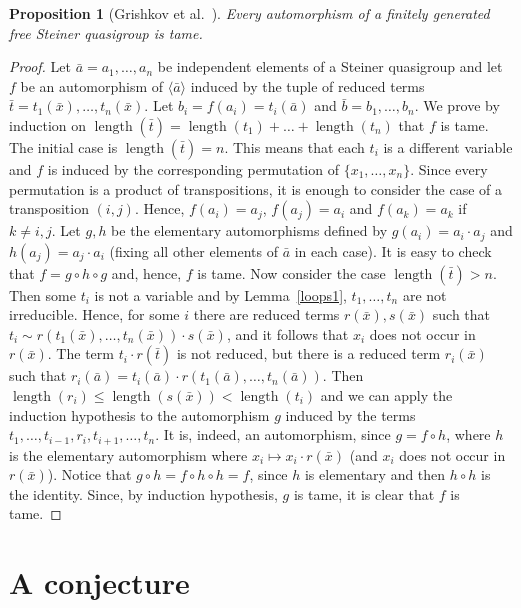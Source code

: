 \documentclass[a4paper, 11pt]{article}
\DeclareMathOperator{\len}{length}
\theoremstyle{note}
\newtheorem{prop}[thm]{Proposition}
\begin{document}
\begin{prop}[Grishkov et al.~\cite{grishkovetal}]\label{loops2}
	Every automorphism of a finitely generated free Steiner quasigroup is tame.
\end{prop}
\begin{proof}  Let  $ \bar{a}=a_1,\ldots,a_n$ be independent elements of a Steiner quasigroup  and let $f$ be an automorphism of $\langle\bar{a}\rangle$ induced by the tuple of reduced terms $\bar{t}=t_1(\bar{x}),\ldots,t_n(\bar{x})$.  Let $b_i=f(a_i)=t_i(\bar{a})$ and $\bar{b}=b_1,\ldots,b_n$.  We prove by induction on $\len(\bar{t})=\len(t_1)+\ldots +\len(t_n)$ that $f$ is tame. The initial case is $\len(\bar{t})=n$. This means that each $t_i$ is a different variable and $f$ is induced by the corresponding permutation of $\{x_1,\ldots,x_n\}$. Since every permutation is a product of transpositions, it is enough to consider the case of a transposition $(i,j)$. Hence, $f(a_i)=a_j$, $f(a_j)=a_i$ and $f(a_k)=a_k$ if $k\neq i,j$. Let $g,h$ be the elementary automorphisms defined by $ g(a_i)=a_i\cdot a_j$ and $h(a_j)=a_j\cdot a_i$ (fixing all other elements of $\bar{a}$ in each case). It is easy to check that $f= g\circ h\circ g$ and, hence, $f$ is tame. Now consider the case $\len(\bar{t})>n$.  Then  some $t_i$ is not a variable and by  Lemma~\ref{loops1}, $t_1,\ldots,t_n$ are not irreducible. 
Hence, for some $i$  there are reduced terms $r(\bar{x}), s(\bar{x})$  such that  $t_i\sim r(t_1(\bar{x}),\ldots,t_n(\bar{x}))\cdot s(\bar{x})$, and it follows that $x_i$ does not occur in $r(\bar{x})$. The term $t_i\cdot r(\bar{t})$ is not reduced, but there is a reduced term $r_i(\bar{x})$ such that $r_i(\bar{a})= t_i(\bar{a})\cdot r(t_1(\bar{a}),\ldots,t_n(\bar{a}))$. Then $\len(r_i)\leq \len(s(\bar{x}))<\len(t_i)$ and we can apply the induction hypothesis to the automorphism $g$ induced by the terms $t_1,\ldots,t_{i-1},r_i,t_{i+1},\ldots,t_n$. It is, indeed, an automorphism, since $g=f\circ h$, where $h$ is the elementary automorphism where $x_i\mapsto x_i\cdot r(\bar{x})$ (and $x_i$ does not occur in $r(\bar{x})$).  Notice that  $g\circ h= f\circ h\circ h= f$, since $h$ is elementary and then $h\circ h$ is the identity. Since, by induction hypothesis, $g$ is tame, it is clear that $f$ is tame.
	\end{proof}


\section{A conjecture}
\end{document}
